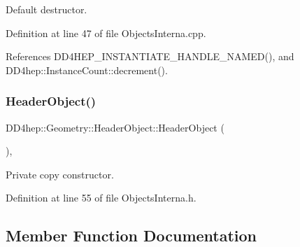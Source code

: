 Default destructor. 



Definition at line 47 of file Objects\+Interna.\+cpp.



References D\+D4\+H\+E\+P\+\_\+\+I\+N\+S\+T\+A\+N\+T\+I\+A\+T\+E\+\_\+\+H\+A\+N\+D\+L\+E\+\_\+\+N\+A\+M\+E\+D(), and D\+D4hep\+::\+Instance\+Count\+::decrement().

\hypertarget{class_d_d4hep_1_1_geometry_1_1_header_object_a335972108c4e573ae75d9f174b8acc19}{}\label{class_d_d4hep_1_1_geometry_1_1_header_object_a335972108c4e573ae75d9f174b8acc19} 
\subsubsection{\texorpdfstring{Header\+Object()}{HeaderObject()}\hspace{0.1cm}{\footnotesize\ttfamily [2/2]}}
{\footnotesize\ttfamily D\+D4hep\+::\+Geometry\+::\+Header\+Object\+::\+Header\+Object (\begin{DoxyParamCaption}\item[{const \hyperlink{class_d_d4hep_1_1_geometry_1_1_header_object}{Header\+Object} \&}]{ }\end{DoxyParamCaption})\hspace{0.3cm}{\ttfamily [inline]}, {\ttfamily [private]}}



Private copy constructor. 



Definition at line 55 of file Objects\+Interna.\+h.



\subsection{Member Function Documentation}
\hypertarget{class_d_d4hep_1_1_geometry_1_1_header_object_aa577cb624bf183b4ac62e22554f069f1}{}\label{class_d_d4hep_1_1_geometry_1_1_header_object_aa577cb624bf183b4ac62e22554f069f1} 
